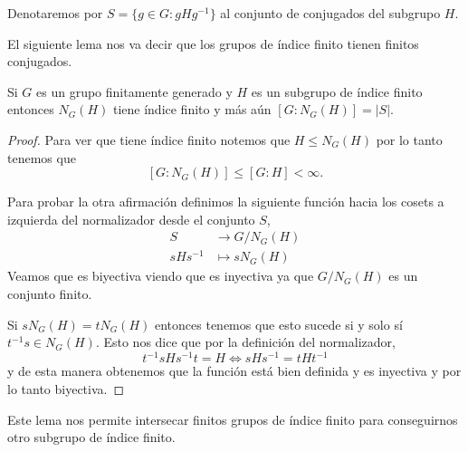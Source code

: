 \documentclass[tesis.tex]{subfiles}
\begin{document}
Denotaremos por $S= \{ g \in G :  gHg^{-1} \}$ al conjunto de conjugados del subgrupo $H$. 

El siguiente lema nos va decir que los grupos de índice finito tienen finitos conjugados.

\begin{lema}\label{lema_normalizador_conjugados}
	Si $G$ es un grupo finitamente generado y $H$ es un subgrupo de índice finito entonces $N_G(H)$ tiene índice finito y más aún $[G:N_G(H)] = |S|$.
\end{lema}
\begin{proof}
	Para ver que tiene índice finito notemos que $H \le N_G(H)$ por lo tanto tenemos que 
	\[
	[G:N_G(H)] \le [G:H] < \infty.
	\]
	
	Para probar la otra afirmación definimos la siguiente función hacia los cosets a izquierda del normalizador desde el conjunto $S$,
	\begin{align*}
		S  &\to  G/N_G(H)  \\
		sHs^{-1} &\mapsto sN_G(H)
	\end{align*}
	Veamos que es biyectiva viendo que es inyectiva ya que $G/N_{G}(H)$ es un conjunto finito.
	
	Si $sN_G(H) = tN_G(H)$ entonces tenemos que esto sucede si y solo sí $t^{-1}s \in N_G(H)$.
	Esto nos dice que por la definición del normalizador,
	\[
	t^{-1}s H s^{-1}t = H \iff sHs^{-1} = tHt^{-1}
	\]
	y de esta manera obtenemos que la función está bien definida y es inyectiva y por lo tanto biyectiva.
	
\end{proof}

Este lema nos permite intersecar finitos grupos de índice finito para conseguirnos otro subgrupo de índice finito. 
\end{document}
